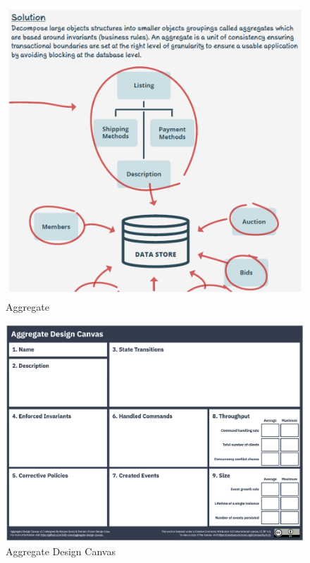 \documentclass[../Main.tex]{subfiles}
\begin{document}
\begin{figure}[H]
    \centering
    \includegraphics[width=1\linewidth]{Images/aggregate.png}
    \caption{Aggregate}
\end{figure}

\begin{figure}[H]
    \centering
    \includegraphics[width=1\linewidth]{Images/aggregate-design-canvas.png}
    \caption{Aggregate Design Canvas}
\end{figure}
\end{document}
